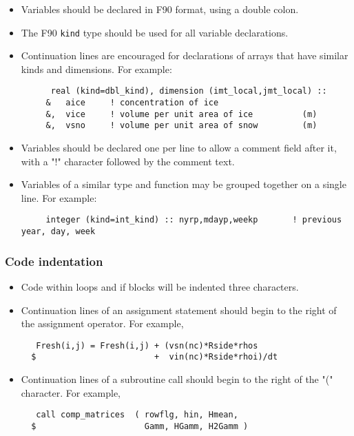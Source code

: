 \begin{itemize}
  \item  Variables should be declared in F90 format, using a double colon.
  \item  The F90 {\tt kind} type should be used for all variable declarations.
  \item  Continuation lines are encouraged for declarations of arrays that
         have similar kinds and dimensions.  For example:
  \begin{verbatim}
      real (kind=dbl_kind), dimension (imt_local,jmt_local) ::
     &   aice     ! concentration of ice
     &,  vice     ! volume per unit area of ice          (m)
     &,  vsno     ! volume per unit area of snow         (m)
  \end{verbatim}
  \item Variables should be declared one per line to allow a comment field
        after it, with a "!" character followed by the comment text.
  \item Variables of a similar type and function may be grouped together on
        a single line.  For example:
  \begin{verbatim}
     integer (kind=int_kind) :: nyrp,mdayp,weekp       ! previous year, day, week
  \end{verbatim}
\end{itemize}

\subsubsection*{Code indentation}

\begin{itemize}
  \item Code within loops and if blocks will be indented three characters.
  \item Continuation lines of an assignment statement should begin to the
        right of the assignment operator.  For example, 
  \begin{verbatim}
   Fresh(i,j) = Fresh(i,j) + (vsn(nc)*Rside*rhos
  $                        +  vin(nc)*Rside*rhoi)/dt
  \end{verbatim}
  \item Continuation lines of a subroutine call should begin to the
        right of the "(" character.  For example, 
  \begin{verbatim}
   call comp_matrices  ( rowflg, hin, Hmean,
  $                      Gamm, HGamm, H2Gamm )
  \end{verbatim}
\end{itemize}
